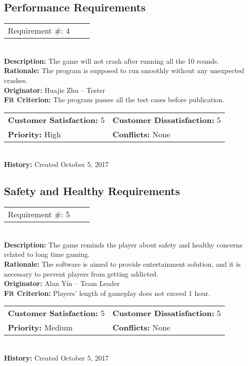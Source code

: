\documentclass[12pt]{article}
\begin{document}
\subsection{Performance Requirements}


\begin{reqbox}
\begin{tabular}{ccc}Requirement \#: 4
\end{tabular} \\
\textbf{Description:} The game will not crash after running all the 10 rounds.\\
\textbf{Rationale:} The program is supposed to run smoothly without any unexpected crashes.\\
\textbf{Originator:} Huajie Zhu -- Tester \\
\textbf{Fit Criterion:} The program passes all the test cases before publication.\\
\begin{tabular}{ll}
\textbf{Customer Satisfaction:} 5 & \textbf{Customer Dissatisfaction:} 5 \\
\textbf{Priority:} High & \textbf{Conflicts:} None\\
\end{tabular} \\
\textbf{History:} Created October 5, 2017
\end{reqbox}



\subsection{Safety and Healthy Requirements}


\begin{reqbox}
\begin{tabular}{ccc}Requirement \#: 5
\end{tabular} \\
\textbf{Description:} The game reminds the player about safety and healthy concerns related to long time gaming.\\
\textbf{Rationale:} The software is aimed to provide entertainment solution, and it is necessary to prevent players from getting addicted. \\
\textbf{Originator:} Alan Yin -- Team Leader \\
\textbf{Fit Criterion:} Players' length of gameplay does not exceed 1 hour.\\
\begin{tabular}{ll}
\textbf{Customer Satisfaction:} 5 & \textbf{Customer Dissatisfaction:} 5 \\
\textbf{Priority:} Medium & \textbf{Conflicts:} None\\
\end{tabular} \\
\textbf{History:} Created October 5, 2017
\end{reqbox}
\end{document}
